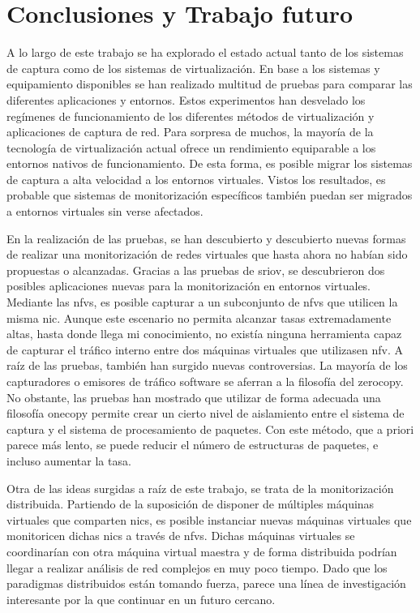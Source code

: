 \chapter{Conclusiones y Trabajo futuro\label{sec:conclusiones}}

A lo largo de este trabajo se ha explorado el estado actual tanto de los sistemas de captura como de los sistemas de virtualización.
En base a los sistemas y equipamiento disponibles se han realizado multitud de pruebas para comparar las diferentes aplicaciones y entornos. 
Estos experimentos han desvelado los regímenes de funcionamiento de los diferentes métodos de virtualización y aplicaciones de captura de red.
Para sorpresa de muchos, la mayoría de la tecnología de virtualización actual ofrece un rendimiento equiparable a los entornos nativos de funcionamiento. De esta forma, es posible migrar los sistemas de captura a alta velocidad a los entornos virtuales. Vistos los resultados, es probable que sistemas de monitorización específicos también puedan ser migrados a entornos virtuales sin verse afectados.

En la realización de las pruebas, se han descubierto y descubierto nuevas formas de realizar una monitorización de redes virtuales que hasta ahora no habían sido propuestas o alcanzadas. Gracias a las pruebas de \gls{sriov}, se descubrieron dos posibles aplicaciones nuevas para la monitorización en entornos virtuales. Mediante las \glspl{nfv}, es posible capturar a un subconjunto de \glspl{nfv} que utilicen la misma \gls{nic}. Aunque este escenario no permita alcanzar tasas extremadamente altas, hasta donde llega mi conocimiento, no existía ninguna herramienta capaz de capturar el tráfico interno entre dos máquinas virtuales que utilizasen \gls{nfv}.
A raíz de las pruebas, también han surgido nuevas controversias. La mayoría de los capturadores o emisores de tráfico software se aferran a la filosofía del \gls{zerocopy}. No obstante, las pruebas han mostrado que utilizar de forma adecuada una filosofía \gls{onecopy} permite crear un cierto nivel de aislamiento entre el sistema de captura y el sistema de procesamiento de paquetes. Con este método, que a priori parece más lento, se puede reducir el número de estructuras de paquetes, e incluso aumentar la tasa.

Otra de las ideas surgidas a raíz de este trabajo, se trata de la monitorización distribuida. Partiendo de la suposición de disponer de múltiples máquinas virtuales que comparten \glspl{nic}, es posible instanciar nuevas máquinas virtuales que monitoricen dichas \glspl{nic} a través de \glspl{nfv}. Dichas máquinas virtuales se coordinarían con otra máquina virtual maestra y de forma distribuida podrían llegar a realizar análisis de red complejos en muy poco tiempo. Dado que los paradigmas distribuidos están tomando fuerza, parece una línea de investigación interesante por la que continuar en un futuro cercano.

